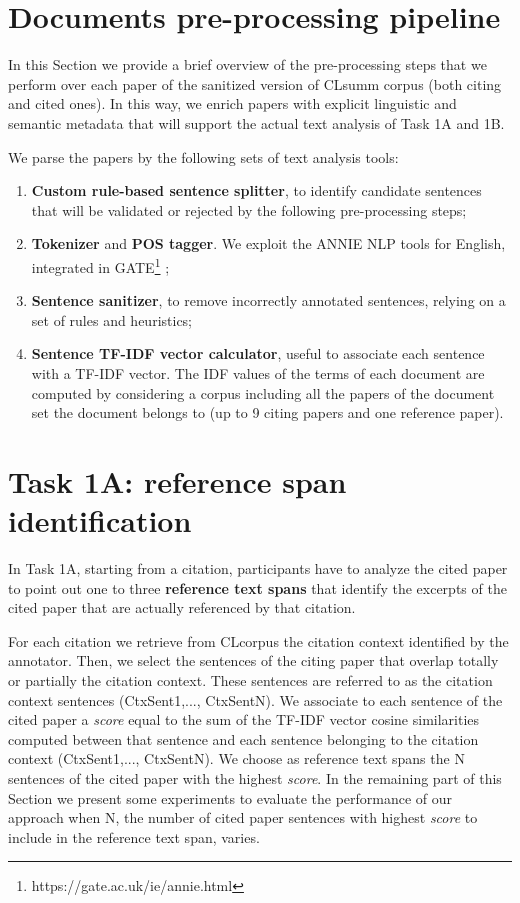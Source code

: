 \documentclass[11pt]{article}
\begin{document}
\section{Documents pre-processing pipeline}
\label{sec:preProcessing}
In this Section we provide a brief overview of the pre-processing steps that we perform over each paper of the sanitized version of CLsumm corpus (both citing and cited ones). In this way, we enrich papers with explicit linguistic and semantic metadata that will support the actual text analysis of Task 1A and 1B.

We parse the papers by the following sets of text analysis tools:
\begin{enumerate}
\item \textbf{Custom rule-based sentence splitter}, to identify candidate sentences that will be validated or rejected by the following pre-processing steps;
\item \textbf{Tokenizer} and \textbf{POS tagger}. We exploit the ANNIE NLP tools for English, integrated in GATE\footnote{https://gate.ac.uk/ie/annie.html} ;
\item \textbf{Sentence sanitizer}, to remove incorrectly annotated sentences, relying on a set of rules and heuristics;
\item \textbf{Sentence TF-IDF vector calculator}, useful to associate each sentence with a TF-IDF vector. The IDF values of the terms of each document are computed by considering a corpus including all the papers of the document set the document belongs to (up to 9 citing papers and one reference paper).
\end{enumerate}

\section{Task 1A: reference span identification}
\label{sec:task1a}
In Task 1A, starting from a citation, participants have to analyze the cited paper to point out one to three \textbf{reference text spans} that identify the excerpts of the cited paper that are actually referenced by that citation.

For each citation we retrieve from CLcorpus the citation context identified by the annotator. Then, we select the sentences of the citing paper that overlap totally or partially the citation context. These sentences are referred to as the citation context sentences (CtxSent1,..., CtxSentN).
We associate to each sentence of the cited paper a \textit{score} equal to the sum of the TF-IDF vector cosine similarities computed between that sentence and each sentence belonging to the citation context (CtxSent1,..., CtxSentN).
We choose as reference text spans the N sentences of the cited paper with the highest \textit{score}. In the remaining part of this Section we present some experiments to evaluate the performance of our approach when N, the number of cited paper sentences with highest \textit{score} to include in the reference text span, varies.
\end{document}

